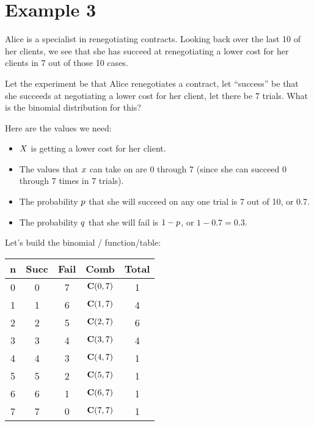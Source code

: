 \documentclass[../../../main.tex]{subfiles}
\begin{document}
\section{Example 3}

Alice is a specialist in renegotiating contracts. Looking back over the last 10 of her clients, we see that she has succeed at renegotiating a lower cost for her clients in 7 out of those 10 cases.

Let the experiment be that Alice renegotiates a contract, let ``success'' be that she succeeds at negotiating a lower cost for her client, let there be 7 trials. What is the binomial distribution for this?

Here are the values we need:

\begin{itemize}
  \item $\RandVar/$ is getting a lower cost for her client.
  \item The values that $\RandVarVal/$ can take on are 0 through 7 (since she can succeed 0 through 7 times in 7 trials).
  \item The probability $\success/$ that she will succeed on any one trial is 7 out of 10, or 0.7.
  \item The probability $\failure/$ that she will fail is $1 - \success/$, or $1 - 0.7 = 0.3$.
\end{itemize}

\noindent
Let's build the binomial \PDFtext/ function/table:

\begin{center}
  \begin{tabular}{| c | c | c | c | c |}
    \hline
  \textbf{n} & \textbf{Succ} & \textbf{Fail} & \textbf{Comb} & \textbf{Total} \\ \hline
  0 & 0    & 7    & $\mathbf{C}(0, 7)$ & 1 \\ \hline
  1 & 1    & 6    & $\mathbf{C}(1, 7)$ & 4 \\ \hline
  2 & 2    & 5    & $\mathbf{C}(2, 7)$ & 6 \\ \hline
  3 & 3    & 4    & $\mathbf{C}(3, 7)$ & 4 \\ \hline
  4 & 4    & 3    & $\mathbf{C}(4, 7)$ & 1 \\ \hline
  5 & 5    & 2    & $\mathbf{C}(5, 7)$ & 1 \\ \hline
  6 & 6    & 1    & $\mathbf{C}(6, 7)$ & 1 \\ \hline
  7 & 7    & 0    & $\mathbf{C}(7, 7)$ & 1 \\ \hline
  \end{tabular}
\end{center}
\end{document}
